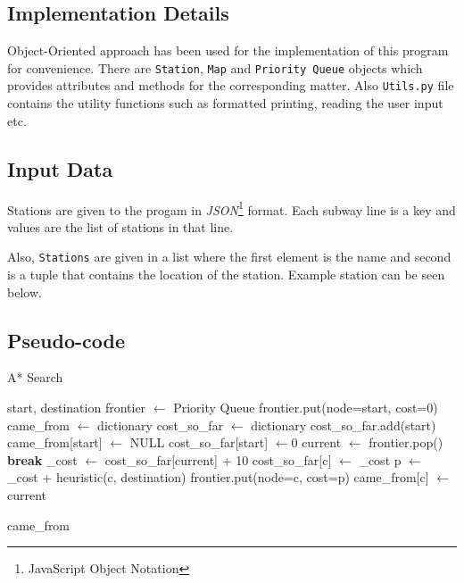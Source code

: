 \documentclass{IEEEtran}
\begin{document}
	
	\subsection{Implementation Details}
	Object-Oriented approach has been used for the implementation of this program for convenience. There are \texttt{Station}, \texttt{Map} and \texttt{Priority Queue} objects which provides attributes and methods for the corresponding matter. Also \texttt{Utils.py} file contains the utility functions such as formatted printing, reading the user input etc.
	
	\subsection{Input Data}
	Stations are given to the progam in \textit{JSON}\footnote{JavaScript Object Notation} format. Each subway line is a key and values are the list of stations in that line. \newline 
	
	 \newline 
	
	Also, \texttt{Stations} are given in a list where the first element is the name and second is a tuple that contains the location of the station. Example station can be seen below. \newline 
	
	 \newline 
	

	\subsection{Pseudo-code}
	\begin{algorithm}
		\caption{A* Search}\label{astar-pseudo}
		\begin{algorithmic}[1]
			 {start, destination}
			\State frontier $\leftarrow$ Priority Queue
			\State frontier.put(node=start, cost=$0$)
			\State came\_from $\leftarrow$ dictionary
			\State cost\_so\_far $\leftarrow$ dictionary
			\State cost\_so\_far.add(start)
			\State came\_from[start] $\leftarrow $ NULL
			\State cost\_so\_far[start] $\leftarrow 0$	
			\State current $\leftarrow$ frontier.pop()
			\State \textbf{break}
			\EndIf
			\State \_cost $\leftarrow$ cost\_so\_far[current] + 10
			\State cost\_so\_far[c] $\leftarrow$ \_cost
			\State p $\leftarrow$ \_cost  + heuristic(c, destination)
			\State frontier.put(node=c, cost=p)
			\State came\_from[c] $\leftarrow$ current
			\EndIf
			\EndFor\\
			\EndWhile
			
			\Return came\_from\
			\EndFunction
		\end{algorithmic}
	\end{algorithm}
	
\end{document}
